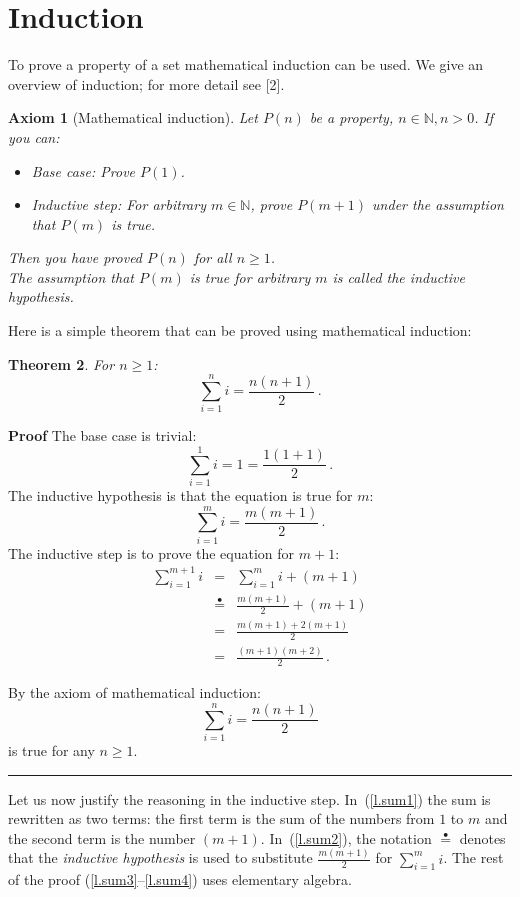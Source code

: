 \documentclass[12pt,a4paper]{article}
\newtheorem{theorem}{Theorem}
\newtheorem{axiom}[theorem]{Axiom}
\newcommand*{\ih}{\stackrel{\bullet}{=}}
\newcommand*{\qed}{\hfill\rule[-2pt]{4pt}{10pt}}
\begin{document}
\section{Induction}

To prove a property of a set mathematical induction can be used. We give an overview of induction; for more detail see [2].

\begin{axiom}[Mathematical induction]\label{ax.induction} Let $P(n)$ be a property, $n\in \mathbb{N}, n>0$. If you can:
\begin{itemize}
\item \emph{Base case}: Prove $P(1)$.
\item \emph{Inductive step}: For arbitrary $m\in \mathbb{N}$, prove $P(m+1)$ under the assumption that $P(m)$ is true.
\end{itemize}
Then you have proved $P(n)$ for all $n\geq 1$.\\
The assumption that $P(m)$ is true for arbitrary $m$ is called the \emph{inductive hypothesis}.
\end{axiom}
Here is a simple theorem that can be  proved using mathematical induction:
\begin{theorem}\label{t.sum}
For $n\geq 1$:
\[
\sum_{i=1}^n i = \frac{n(n+1)}{2}\,.
\]
\end{theorem}

\textbf{Proof} The base case is trivial:
\[
\sum_{i=1}^1 i = 1 =\frac{1(1+1)}{2}\,.
\]
The inductive hypothesis is that the equation is true for $m$:
\[
\sum_{i=1}^{m} i = \frac{m(m+1)}{2}\,.
\]
The inductive step is to prove the equation for $m+1$:
\begin{eqnarray}
\sum_{i=1}^{m+1} i &=& \sum_{i=1}^m i + (m+1)\label{l.sum1}\\
&\ih{}&\frac{m(m+1)}{2} + (m+1)\label{l.sum2}\\
&=&\frac{m(m+1) + 2(m+1)}{2}\label{l.sum3}\\
&=&\frac{(m+1)(m+2)}{2}\,.\label{l.sum4}
\end{eqnarray}

By the axiom of mathematical induction:
\[
\sum_{i=1}^n i = \frac{n(n+1)}{2}
\] is true for any $n\geq 1$.\qed

Let us now justify the reasoning in the inductive step. In~(\ref{l.sum1}) the sum is rewritten as two terms: the first term is the sum of the numbers from $1$ to $m$ and the second term is the number $(m+1)$. In~(\ref{l.sum2}), the notation $\ih{}$ denotes that the \emph{inductive hypothesis} is used to substitute $\frac{m(m+1)}{2}$ for $\sum_{i=1}^m i$. The rest of the proof (\ref{l.sum3}--\ref{l.sum4}) uses elementary algebra.
\end{document}
